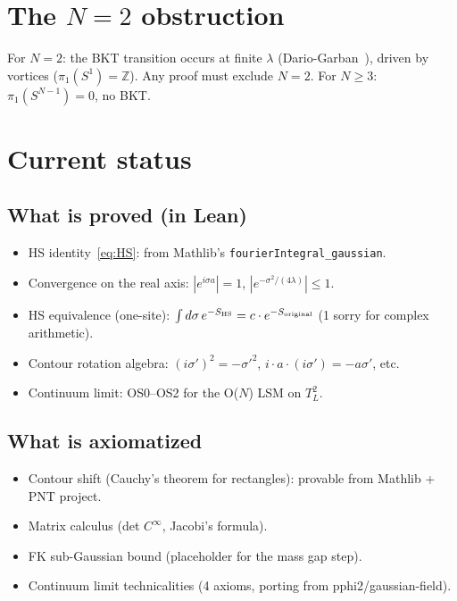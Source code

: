 \documentclass[12pt]{article}
\theoremstyle{definition}
\theoremstyle{remark}
\newcommand{\Z}{\mathbb{Z}}
\begin{document}
\section{The $N = 2$ obstruction}

For $N = 2$: the BKT transition occurs at finite $\lambda$
(Dario-Garban~\cite{DG25}), driven by vortices ($\pi_1(S^1)=\Z$).
Any proof must exclude $N = 2$. For $N \ge 3$: $\pi_1(S^{N-1})=0$,
no BKT.

\section{Current status}

\subsection{What is proved (in Lean)}

\begin{itemize}
\item HS identity~\eqref{eq:HS}: from Mathlib's
  \texttt{fourierIntegral\_gaussian}.
\item Convergence on the real axis: $|e^{i\sigma a}| = 1$,
  $|e^{-\sigma^2/(4\lambda)}| \le 1$.
\item HS equivalence (one-site): $\int d\sigma\,e^{-S_{\rm HS}}
  = c\cdot e^{-S_{\rm original}}$ (1 sorry for complex arithmetic).
\item Contour rotation algebra: $(i\sigma')^2 = -\sigma'^2$,
  $i\cdot a\cdot(i\sigma') = -a\sigma'$, etc.
\item Continuum limit: OS0--OS2 for the O($N$) LSM on $T^2_L$.
\end{itemize}

\subsection{What is axiomatized}

\begin{itemize}
\item Contour shift (Cauchy's theorem for rectangles): provable from
  Mathlib + PNT project.
\item Matrix calculus (det $C^\infty$, Jacobi's formula).
\item FK sub-Gaussian bound (placeholder for the mass gap step).
\item Continuum limit technicalities (4 axioms, porting from
  pphi2/gaussian-field).
\end{itemize}
\end{document}
